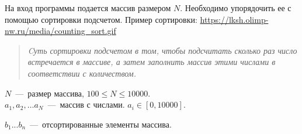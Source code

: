 На вход программы подается массив размером $N$. Необходимо упорядочить ее с помощью сортировки подсчетом.
Пример сортировки: \url{https://lksh.olimp-nw.ru/media/counting_sort.gif}

\begin{quote}
\textit{Cуть сортировки подсчетом в том, чтобы подсчитать сколько раз число встречается в массиве, а затем заполнить массив этими числами в соответствии с количеством.}
\end{quote}

\InputFile

\noindent
$N$~---~размер массива, $100 \leq N \leq 10000$. \\
$a_1, a_2, \ldots a_N$~---~массив с числами. $ a_i \in [0, 10000]$. 

\OutputFile

\noindent
$b_1 ... b_n$~---~отсортированные элементы массива.

\SAMPLES
